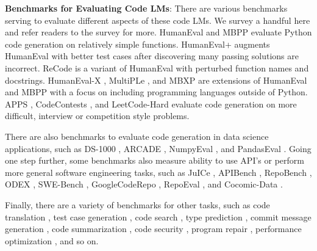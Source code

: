 \noindent \textbf{Benchmarks for Evaluating Code LMs}: There are various benchmarks serving to evaluate different aspects of these code LMs. We survey a handful here and refer readers to the survey \citep{zhang2023survey} for more. HumanEval \citep{chen2021evaluating} and MBPP \citep{austin2021program} evaluate Python code generation on relatively simple functions. HumanEval+ \citep{liu2023your} augments HumanEval with better test cases after discovering many passing solutions are incorrect. ReCode \citep{wang2022recode} is a variant of HumanEval with perturbed function names and docstrings. HumanEval-X  \citep{zheng2023codegeex}, MultiPLe \citep{cassano2022multipl}, and MBXP \citep{athiwaratkun2022multi} are extensions of HumanEval and MBPP with a focus on including programming languages outside of Python. APPS \citep{hendrycks2021measuring}, CodeContests \citep{li2022competition}, and LeetCode-Hard \citep{shinn2023reflexion} evaluate code generation on more difficult, interview or competition style problems.

There are also benchmarks to evaluate code generation in data science applications, such as DS-1000 \citep{lai2023ds}, ARCADE \citep{yin2022natural}, NumpyEval \citep{zhang2023toolcoder}, and PandasEval \citep{jain2022jigsaw}. Going one step further, some benchmarks also measure ability to use API's or perform more general software engineering tasks, such as JuICe \citep{agashe2019juice}, APIBench \citep{patil2023gorilla}, RepoBench \citep{liu2023repobench}, ODEX \citep{wang2022execution}, SWE-Bench \citep{jimenez2023swe}, GoogleCodeRepo \citep{shrivastava2023repository}, RepoEval \citep{zhang2023repocoder}, and Cocomic-Data \citep{ding2022cocomic}.

Finally, there are a variety of benchmarks for other tasks, such as code translation \citep{roziere2020unsupervised, zhu2022xlcost, ahmad-etal-2021-avatar}, test case generation \citep{tufano2022methods2test, watson2020learning}, code search \citep{husain2019codesearchnet}, type prediction \citep{mir2022type4py, wei2023typet5, malik2019nl2type}, commit message generation \citep{liu2020atom}, code summarization \citep{leclair2019neural, iyer2016summarizing, barone2017parallel, hasan2021codesc, alon2018code2seq}, code security \citep{liguori2022can, pearce2022asleep, tony2023llmseceval}, program repair \citep{jiang2023impact, xia2022practical, tufano2019empirical, haque2022fixeval, jin2023inferfix, gupta2017deepfix, berabi2021tfix}, performance optimization \citep{garg2022deepperf, madaan2023learning}, and so on.

